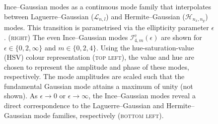 \documentclass[../Thesis-IJspeert.tex]{subfiles}
\begin{document}
\begin{figure}[t]
\caption[Ince--Gaussian modes as a continuous mode family that interpolates between Laguerre--Gaussian and Hermite--Gaussian modes]{Ince--Gaussian modes as a continuous mode family that interpolates between Laguerre--Gaussian ($\mathcal{L}_{n,l}$) and Hermite--Gaussian ($\mathcal{H}_{n_x,n_y}$) modes. This transition is parametrised via the ellipticity parameter $\epsilon$. \textsc{(right)} The even Ince--Gaussian modes $\mathcal{I}_{4,m}^\mathrm{e}(\epsilon)$ are shown for $\epsilon\in\{0,2,\infty\}$ and $m\in\{0,2,4\}$. Using the hue-saturation-value (HSV) colour representation \textsc{(top left)}, the value and hue are chosen to represent the amplitude and phase of these modes, respectively. The mode amplitudes are scaled such that the fundamental Gaussian mode attains a maximum of unity (not shown). As $\epsilon\rightarrow 0$ or $\epsilon\rightarrow \infty$, the Ince--Gaussian modes reveal a direct correspondence to the Laguerre--Gaussian and Hermite--Gaussian mode families, respectively \textsc{(bottom left)}.}
\label{incegauss} 
\end{figure}
\end{document}
